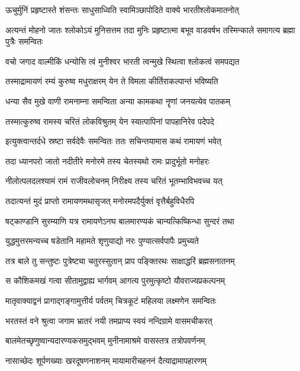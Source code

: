 \twolineshloka
{ऊचुर्मुनिं प्रहृष्टास्ते शंसन्तः साधुसाध्विति}
{स्वामिञ्छापोदिते वाक्ये भारतीश्लोकमातनोत्}%


\threelineshloka
{अत्यन्तं मोहनो जातः श्लोकोऽयं मुनिसत्तम}
{तदा मुनिः प्रहृष्टात्मा बभूव वाडवर्षभ}
{तस्मिन्काले समागत्य ब्रह्मा पुत्रैः समन्वितः}%

\twolineshloka
{वचो जगाद वाल्मीकिं धन्योसि त्वं मुनीश्वर}
{भारती त्वन्मुखे स्थित्वा श्लोकत्वं समपद्यत}%

\twolineshloka
{तस्माद्रामायणं रम्यं कुरुष्व मधुराक्षरम्}
{येन ते विमला कीर्तिराकल्पान्तं भविष्यति}%

\twolineshloka
{धन्या सैव मुखे वाणी रामनाम्ना समन्विता}
{अन्या कामकथा नॄणां जनयत्येव पातकम्}%

\twolineshloka
{तस्मात्कुरुष्व रामस्य चरितं लोकविश्रुतम्}
{येन स्यात्पापिनां पापहानिरेव पदेपदे}%

\twolineshloka
{इत्युक्त्वान्तर्दधे स्रष्टा सर्वदेवैः समन्वितः}
{ततः सचिन्तयामास कथं रामायणं भवेत्}%

\twolineshloka
{तदा ध्यानपरो जातो नदीतीरे मनोरमे}
{तस्य चेतस्यथो रामः प्रादुर्भूतो मनोहरः}%

\twolineshloka
{नीलोत्पलदलश्यामं रामं राजीवलोचनम्}
{निरीक्ष्य तस्य चरितं भूतम्भाविभवच्च यत्}%

\twolineshloka
{तदात्यन्तं मुदं प्राप्तो रामायणमथासृजत्}
{मनोरमपदैर्युक्तं वृत्तैर्बहुविधैरपि}%

\twolineshloka
{षट्काण्डानि सुरम्याणि यत्र रामायणेऽनघ}
{बालमारण्यकं चान्यत्किष्किन्धा सुन्दरं तथा}%

\twolineshloka
{युद्धमुत्तरमन्यच्च षडेतानि महामते}
{शृणुयाद्यो नरः पुण्यात्सर्वपापैः प्रमुच्यते}%

\twolineshloka
{तत्र बाले तु सन्तुष्टः पुत्रेष्ट्या चतुरस्सुतान्}
{प्राप पङ्क्तिरथः साक्षाद्धरिं ब्रह्मसनातनम्}%

\twolineshloka
{स कौशिकमखं गत्वा सीतामुद्वाह्य भार्गवम्}
{आगत्य पुरमुत्कृष्टो यौवराज्यप्रकल्पनम्}%

\twolineshloka
{मातृवाक्याद्वनं प्रागाद्गङ्गामुत्तीर्य पर्वतम्}
{चित्रकूटं महिलया लक्ष्मणेन समन्वितः}%

\twolineshloka
{भरतस्तं वने श्रुत्वा जगाम भ्रातरं नयी}
{तमप्राप्य स्वयं नन्दिग्रामे वासमचीकरत्}%

\twolineshloka
{बालमेतच्छृणुष्वान्यदारण्यकसमुद्भवम्}
{मुनीनामाश्रमे वासस्तत्र तत्रोपवर्णनम्}%

\twolineshloka
{नासाच्छेदः शूर्पणख्याः खरदूषणनाशनम्}
{मायामारीचहननं दैत्याद्रामापहारणम्}%

